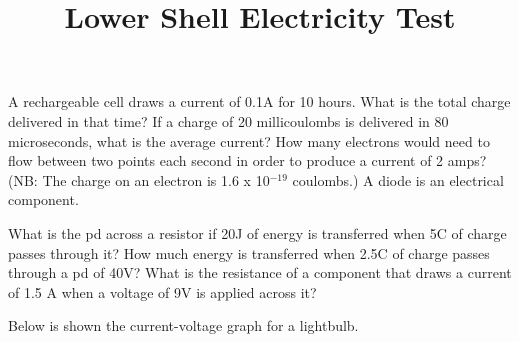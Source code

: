 \documentclass[addpoints, 11pt,a4paper]{exam}
\title{Lower Shell Electricity Test}
\author{}
\date{}
\newcommand{\ans}[1]{\fillwithdottedlines{#1cm} \droppoints}
\begin{document}
\pagestyle{empty}
\maketitle \thispagestyle{empty}
\begin{center}
\end{center}
\pointsdroppedatright
\begin{questions}
    \question[3] A rechargeable cell draws a current of 0.1A for 10 hours. What is the total charge delivered in that time? \fillwithdottedlines{2cm} \droppoints
    \question[3] If a charge of 20 millicoulombs is delivered in 80 microseconds, what is the average current? \ans{2}
    \question[3] How many electrons would need to flow between two points each second in order to produce a current of 2 amps? (NB: The charge on an electron is  1.6 x 10$^{-19}$ coulombs.) \ans{2}
    \question A diode is an electrical component.
\question[3] What is the pd across a resistor if 20J of energy is transferred when 5C of charge passes through it? \ans{2}
\question[3] How much energy is transferred when 2.5C of charge passes through a pd of 40V? \ans{2}
\question[3] What is the resistance of a component that draws a current of 1.5 A when a voltage of 9V is applied across it? \ans{2}
\question 
{}
\newpage
\question[3] Below is shown the current-voltage graph for a lightbulb.  


\end{questions}
\end{document}
